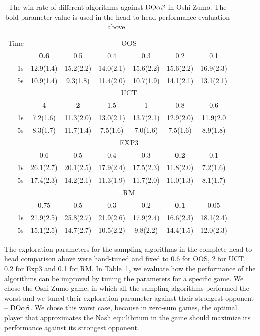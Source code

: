 \begin{table}
\centering
\begin{scriptsize}
\begin{tabular}{|r|cccccc|}\hline
Time&\multicolumn{6}{|c|}{OOS}\\
&\textbf{0.6}&0.5&0.4&0.3&0.2&0.1\\
1s&12.9(1.4)&15.2(2.2)&14.0(2.1)&15.6(2.2)&15.6(2.2)&16.9(2.3)\\
5s&10.9(1.4)&9.3(1.8)&11.4(2.0)&10.7(1.9)&14.1(2.1)&13.1(2.1)\\\hline
&\multicolumn{6}{|c|}{UCT}\\
&4&\textbf{2}&1.5&1&0.8&0.6\\
1s&7.2(1.6)&11.3(2.0)&13.0(2.1)&13.7(2.1)&12.9(2.0)&11.9(2.0\\
5s&8.3(1.7)&11.7(1.4)&7.5(1.6)&7.0(1.6)&7.5(1.6)&8.9(1.8)\\\hline
&\multicolumn{6}{|c|}{EXP3}\\
&0.6&0.5&0.4&0.3&\textbf{0.2}&0.1\\
1s&26.1(2.7)&20.1(2.5)&17.9(2.4)&17.5(2.3)&11.8(2.0)&7.2(1.6)\\
5s&17.4(2.3)&14.2(2.1)&11.3(1.9)&11.7(2.0)&11.0(1.3)&8.1(1.7)\\\hline
&\multicolumn{6}{|c|}{RM}\\
&0.75&0.5&0.3&0.2&\textbf{0.1}&0.05\\
1s&21.9(2.5)&25.8(2.7)&21.9(2.6)&17.9(2.4)&16.6(2.3)&18.1(2.4)\\
5s&15.1(2.5)&14.7(2.7)&10.5(2.2)&9.8(2.2)&14.4(1.5)&12.0(2.3)\\\hline
\end{tabular}

\end{scriptsize}
\caption{The win-rate of different algorithms against $\textrm{DO}\alpha\beta$ in Oshi Zumo. The bold parameter value is used in the head-to-head performance evaluation above.}\label{fig:tuning}
\end{table}

The exploration parameters for the sampling algorithms in the complete head-to-head comparison above were hand-tuned and fixed to 0.6 for OOS, 2 for UCT, 0.2 for Exp3 and 0.1 for RM. In Table~\ref{fig:tuning}, we evaluate how the performance of the algorithms can be improved by tuning the parameters for a specific game. We chose the Oshi-Zumo game, in which all the sampling algorithms performed the worst and we tuned their exploration parameter against their strongest opponent -- $\textrm{DO}\alpha\beta$. We chose this worst case, because in zero-sum games, the optimal player that approximates the Nash equilibrium in the game should maximize its performance against its strongest opponent.

